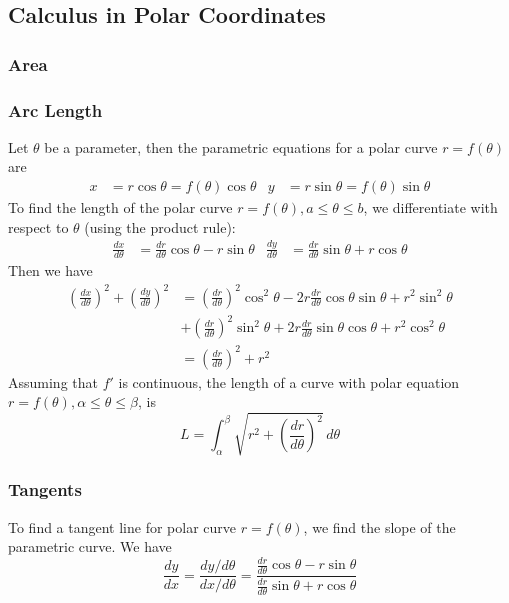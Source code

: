 \subsection{Calculus in Polar Coordinates}

\subsubsection*{Area}

\subsubsection*{Arc Length}
Let \(\theta\) be a parameter, then the parametric equations for a polar curve
\(r=f(\theta)\) are
\begin{align*}
    x &= r\cos\theta=f(\theta)\cos\theta & y &= r\sin\theta=f(\theta)\sin\theta
\end{align*}
To find the length of the polar curve \(r=f(\theta),a\leq\theta\leq b\),
we differentiate with respect to \(\theta\) (using the product rule):
\begin{align*}
    \frac{dx}{d\theta} &= \frac{dr}{d\theta}\cos\theta-r\sin\theta
    & \frac{dy}{d\theta} &= \frac{dr}{d\theta}\sin\theta+r\cos\theta
\end{align*}
Then we have
\begin{align*}
    \left(\frac{dx}{d\theta}\right)^2+\left(\frac{dy}{d\theta}\right)^2
    &= \left(\frac{dr}{d\theta}\right)^2\cos^2\theta
    -2r\frac{dr}{d\theta}\cos\theta\sin\theta+r^2\sin^2\theta \\
    &+ \left(\frac{dr}{d\theta}\right)^2\sin^2\theta
    +2r\frac{dr}{d\theta}\sin\theta\cos\theta+r^2\cos^2\theta \\
    &= \left(\frac{dr}{d\theta}\right)^2+r^2
\end{align*}
Assuming that \(f'\) is continuous, the length of a curve with polar equation
\(r=f(\theta),\alpha\leq\theta\leq\beta\), is
\[L
=\int_{\alpha}^{\beta}\sqrt{r^2+\left(\frac{dr}{d\theta}\right)^2}\,d\theta\]

\subsubsection*{Tangents}
To find a tangent line for polar curve \(r=f(\theta)\),
we find the slope of the parametric curve.
We have
\[\frac{dy}{dx}=\frac{dy/d\theta}{dx/d\theta}
=\frac{\frac{dr}{d\theta}\cos\theta-r\sin\theta}
{\frac{dr}{d\theta}\sin\theta+r\cos\theta}\]
